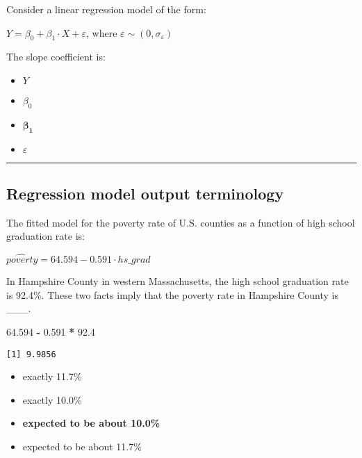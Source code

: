\documentclass[
]{book}
\newenvironment{Shaded}{\begin{snugshade}}{\end{snugshade}}
\newcommand{\FloatTok}[1]{\textcolor[rgb]{0.00,0.00,0.81}{#1}}
\newcommand{\OperatorTok}[1]{\textcolor[rgb]{0.81,0.36,0.00}{\textbf{#1}}}
\newcommand{\StringTok}[1]{\textcolor[rgb]{0.31,0.60,0.02}{#1}}
\begin{document}
Consider a linear regression model of the form:

\(Y=\beta_0+ \beta_1\cdot X + \varepsilon\), where \(\varepsilon \sim(0, \sigma_{\varepsilon})\)

The slope coefficient is:

\begin{itemize}
\item
  \(Y\)
\item
  \(\beta_0\)
\item
  \(\mathbf{\beta_1}\)
\item
  \(\varepsilon\)
\end{itemize}

\begin{center}\rule{0.5\linewidth}{0.5pt}\end{center}

\hypertarget{regression-model-output-terminology}{%
\subsection{Regression model output terminology}\label{regression-model-output-terminology}}

The fitted model for the poverty rate of U.S. counties as a function of high school graduation rate is:

\(\widehat{poverty} = 64.594 − 0.591 \cdot hs\_grad\)

In Hampshire County in western Massachusetts, the high school graduation rate is 92.4\%. These two facts imply that the poverty rate in Hampshire County is \_\_\_.

\begin{Shaded}
\begin{Highlighting}[]
\FloatTok{64.594} \OperatorTok{-}\StringTok{ }\FloatTok{0.591} \OperatorTok{*}\StringTok{ }\FloatTok{92.4}
\end{Highlighting}
\end{Shaded}

\begin{verbatim}
[1] 9.9856
\end{verbatim}

\begin{itemize}
\item
  exactly 11.7\%
\item
  exactly 10.0\%
\item
  \textbf{expected to be about 10.0\%}
\item
  expected to be about 11.7\%
\end{itemize}
\end{document}
